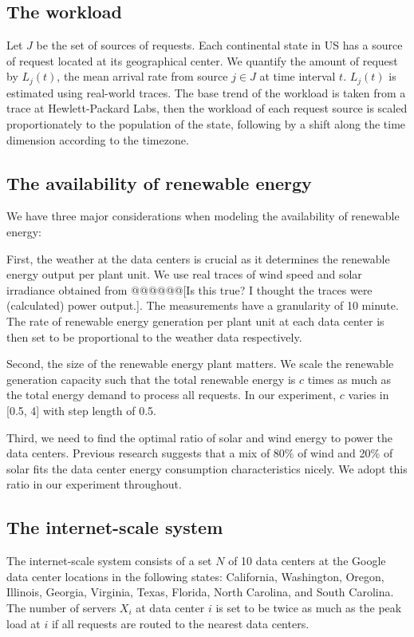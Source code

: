 \documentclass{acm_proc_article-sp}
\begin{document}
\subsection{The workload}
Let $J$ be the set of sources of requests. Each continental state in US has a source of request located at its geographical center. We quantify the amount of request by $L_j(t)$, the mean arrival rate from source $j \in J$ at time interval $t$. $L_j(t)$ is estimated using real-world traces. The base trend of the workload is taken from a trace at Hewlett-Packard Labs, then the workload of each request source is scaled proportionately to the population of the state, following by a shift along the time dimension according to the timezone.

    
\subsection{The availability of renewable energy}
We have three major considerations when modeling the availability of renewable energy:  

First, the weather at the data centers is crucial as it determines the renewable energy output per plant unit. We use real traces of wind speed and solar irradiance obtained from \cite{renew1} \cite{renew2} @@@@@@[Is this true? I thought the traces were (calculated) power output.]. The measurements have a granularity of 10 minute. The rate of renewable energy generation per plant unit at each data center is then set to be proportional to the weather data respectively.

Second, the size of the renewable energy plant matters. We scale the renewable generation capacity such that the total renewable energy is $c$ times as much as the total energy demand to process all requests. In our experiment, $c$ varies in [0.5, 4] with step length of 0.5.  

Third, we need to find the optimal ratio of solar and wind energy to power the data centers. Previous research \cite{adam:GLB} suggests that a mix of 80\% of wind and 20\% of solar fits the data center energy consumption characteristics nicely. We adopt this ratio in our experiment throughout.

\subsection{The internet-scale system}
The internet-scale system consists of a set $N$ of 10 data centers at the Google data center locations in the following states: California, Washington, Oregon, Illinois, Georgia, Virginia, Texas, Florida, North Carolina, and South Carolina. The number of servers $X_i$ at data center $i$ is set to be twice as much as the peak load at $i$ if all requests are routed to the nearest data centers.
\end{document}
